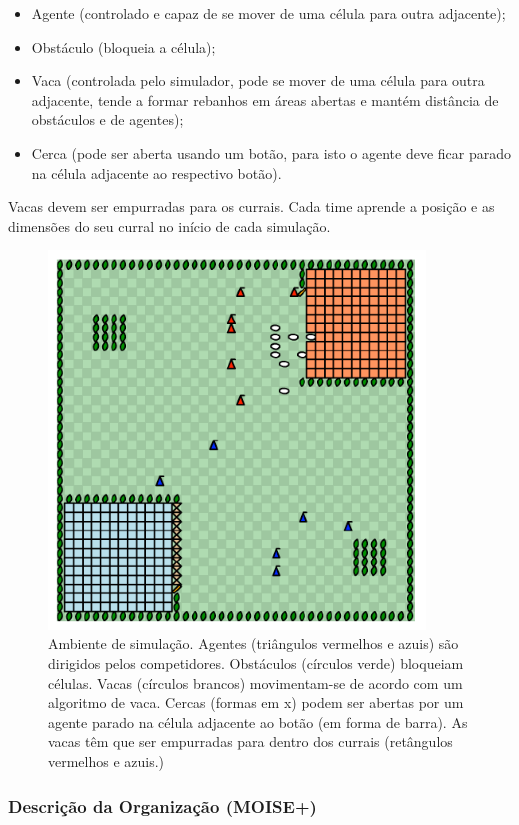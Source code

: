 \documentclass{llncs}
\begin{document}
\begin{itemize}
\item Agente (controlado e capaz de se mover de uma célula para outra adjacente);
\item Obstáculo (bloqueia a célula);
\item Vaca (controlada pelo simulador, pode se mover de uma célula para outra adjacente, tende a formar rebanhos em áreas abertas e mantém distância de obstáculos e de agentes);
\item Cerca (pode ser aberta usando um botão, para isto o agente deve ficar parado na célula adjacente ao respectivo botão).
\end{itemize}

Vacas devem ser empurradas para os currais. Cada time aprende a posição e as dimensões do seu curral no início de cada simulação.

\begin{figure}[!ht]
\centering 
\includegraphics[width=10cm]{images/env.png}
\caption{Ambiente de simulação. Agentes (triângulos vermelhos e azuis) são dirigidos pelos competidores. Obstáculos (círculos verde) bloqueiam células. Vacas (círculos brancos) movimentam-se de acordo com um algoritmo de vaca. Cercas (formas em x) podem ser abertas por um agente parado na célula adjacente ao botão (em forma de barra). As vacas têm que ser empurradas para dentro dos currais (retângulos vermelhos e azuis.)}
\end{figure}


\subsubsection{Descrição da Organização (MOISE+)}
\end{document}
